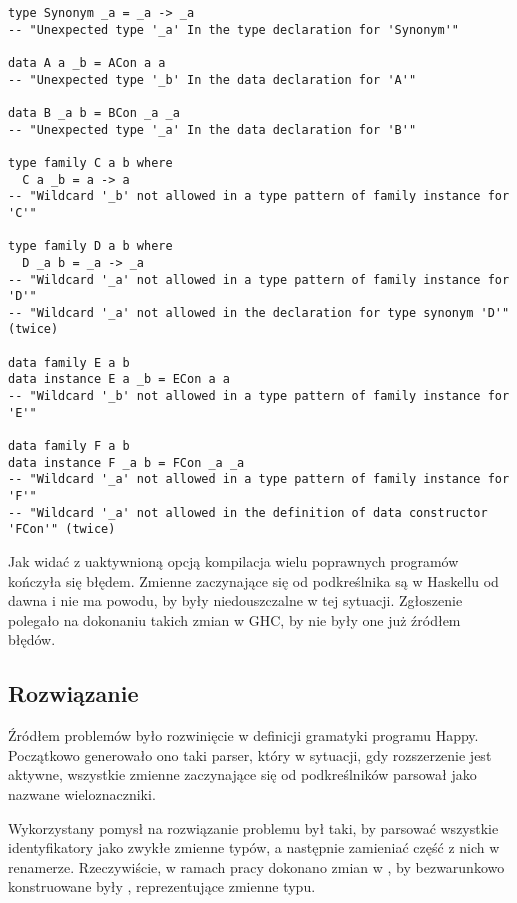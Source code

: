 \begin{lstlisting}[label={lst:namedwcs_not_allowed},
                   caption={Deklaracje, w których kompilacja kończyła się błędem, przy aktywnym rozszerzeniu \code{NamedWildCards}.}]
type Synonym _a = _a -> _a
-- "Unexpected type '_a' In the type declaration for 'Synonym'"

data A a _b = ACon a a
-- "Unexpected type '_b' In the data declaration for 'A'"

data B _a b = BCon _a _a
-- "Unexpected type '_a' In the data declaration for 'B'"

type family C a b where
  C a _b = a -> a
-- "Wildcard '_b' not allowed in a type pattern of family instance for 'C'"

type family D a b where
  D _a b = _a -> _a
-- "Wildcard '_a' not allowed in a type pattern of family instance for 'D'"
-- "Wildcard '_a' not allowed in the declaration for type synonym 'D'" (twice)

data family E a b
data instance E a _b = ECon a a
-- "Wildcard '_b' not allowed in a type pattern of family instance for 'E'"

data family F a b
data instance F _a b = FCon _a _a
-- "Wildcard '_a' not allowed in a type pattern of family instance for 'F'"
-- "Wildcard '_a' not allowed in the definition of data constructor 'FCon'" (twice)
\end{lstlisting}

Jak widać z uaktywnioną opcją  kompilacja wielu poprawnych programów kończyła się błędem. Zmienne zaczynające się od podkreślnika są w Haskellu od dawna i nie ma powodu, by były niedouszczalne w tej sytuacji. Zgłoszenie polegało na dokonaniu takich zmian w GHC, by nie były one już źródłem błędów.

\subsection{Rozwiązanie} %

Źródłem problemów było rozwinięcie  w definicji gramatyki programu Happy. Początkowo generowało ono taki parser, który w sytuacji, gdy rozszerzenie jest aktywne, wszystkie zmienne zaczynające się od podkreślników parsował jako nazwane wieloznaczniki.

Wykorzystany pomysł na rozwiązanie problemu był taki, by parsować wszystkie identyfikatory jako zwykłe zmienne typów, a następnie zamieniać część z nich w renamerze. Rzeczywiście, w ramach pracy dokonano zmian w , by bezwarunkowo konstruowane były , reprezentujące zmienne typu.

